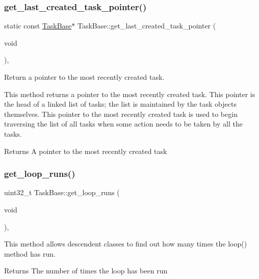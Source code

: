 \subsubsection{\texorpdfstring{get\+\_\+last\+\_\+created\+\_\+task\+\_\+pointer()}{get\_last\_created\_task\_pointer()}}
{\footnotesize\ttfamily static const \mbox{\hyperlink{class_task_base}{Task\+Base}}$\ast$ Task\+Base\+::get\+\_\+last\+\_\+created\+\_\+task\+\_\+pointer (\begin{DoxyParamCaption}\item[{void}]{ }\end{DoxyParamCaption})\hspace{0.3cm}{\ttfamily [inline]}, {\ttfamily [static]}}



Return a pointer to the most recently created task. 

This method returns a pointer to the most recently created task. This pointer is the head of a linked list of tasks; the list is maintained by the task objects themselves. This pointer to the most recently created task is used to begin traversing the list of all tasks when some action needs to be taken by all the tasks. \begin{DoxyReturn}{Returns}
A pointer to the most recently created task 
\end{DoxyReturn}
\mbox{\label{class_task_base_adbc9cc6b14c5396c38457edc9c9bc215}} 
\subsubsection{\texorpdfstring{get\+\_\+loop\+\_\+runs()}{get\_loop\_runs()}}
{\footnotesize\ttfamily uint32\+\_\+t Task\+Base\+::get\+\_\+loop\+\_\+runs (\begin{DoxyParamCaption}\item[{void}]{ }\end{DoxyParamCaption})\hspace{0.3cm}{\ttfamily [inline]}, {\ttfamily [protected]}}

This method allows descendent classes to find out how many times the {\ttfamily loop()} method has run. \begin{DoxyReturn}{Returns}
The number of times the loop has been run 
\end{DoxyReturn}
\mbox{\label{class_task_base_a69b0a4031cf715d9d3a6ecd3b29f5cbe}} 
